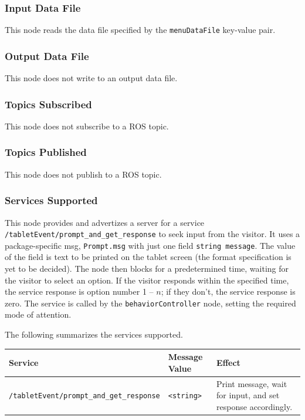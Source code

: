 \documentclass{CSSRforAfrica}
\begin{document}
{{\subsubsection*{Input Data File}
This node reads the data file specified by the {\small \verb+menuDataFile+} key-value pair.


\subsubsection*{Output Data File}
This node does not write to an output data file.


\subsubsection*{Topics Subscribed}

This node does not subscribe to a ROS topic.



\subsubsection*{Topics Published}

This node does not publish to a ROS topic.
 

\subsubsection*{Services Supported}

This node  provides and advertizes a server for a service {\small \verb+/tabletEvent/prompt_and_get_response+} to seek input from the visitor.  It uses a package-specific msg, {\small \verb+Prompt.msg+} with just one field  {\small \verb+string message+}. The value of the field is text to be printed on the tablet screen (the format specification is yet to be decided). The node then blocks for a predetermined time, waiting for the visitor to select an option.    If the visitor responds within the specified time, the service response is option number 1 -- $n$; if they don't, the service response is zero.  
The service  is called by  the {\small \verb+behaviorController+} node, setting the required  mode of attention.

\newpage
\noindent The following summarizes the services supported.

\begin{center}
\begin{tabularx}{\linewidth}{| l | l | X|}
\hline 
{\small Service }                                                                                & {\small Message Value}    &  {\small Effect}       \\
\hline
{\footnotesize \verb+/tabletEvent/prompt_and_get_response+ }  & {\footnotesize \verb+<string>+} & {\small Print message, wait for input, and set response accordingly.}\\
\hline
\end{tabularx}
\end{center}

}}
\end{document}
